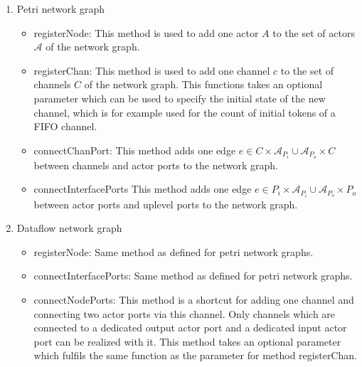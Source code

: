 \begin{enumerate}
\item Petri network graph

  \begin{itemize}
  \item registerNode:
    This method is used to add one actor $A$ to the set of actors $\mathcal{A}$
    of the network graph.

  \item registerChan:
    This method is used to add one channel $c$ to the set of channels $C$
    of the network graph. This functions takes an optional parameter which can
    be used to specify the initial state of the new channel, which is
    for example used for the count of initial tokens of a FIFO channel.

  \item connectChanPort:
    This method adds one edge $e \in C \times \mathcal{A}_{P_{i}} \cup \mathcal{A}_{P_{o}} \times C$
    between channels and actor ports to the network graph.

  \item connectInterfacePorts
    This method adds one edge $e \in P_{i} \times \mathcal{A}_{P_{i}} \cup \mathcal{A}_{P_{o}} \times P_{o}$
    between actor ports and uplevel ports to the network graph.

  \end{itemize}

\item Dataflow network graph

  \begin{itemize}
  \item registerNode: Same method as defined for petri network graphs.
  
  \item connectInterfacePorts: Same method as defined for petri network graphs.
  
  \item connectNodePorts:
    This method is a shortcut for adding one channel and
    connecting two actor ports via this channel. Only channels
    which are connected to a dedicated output actor port and
    a dedicated input actor port can be realized with it.
    This method takes an optional parameter which fulfils
    the same function as the parameter for method registerChan.
  
  \end{itemize}

\end{enumerate}

